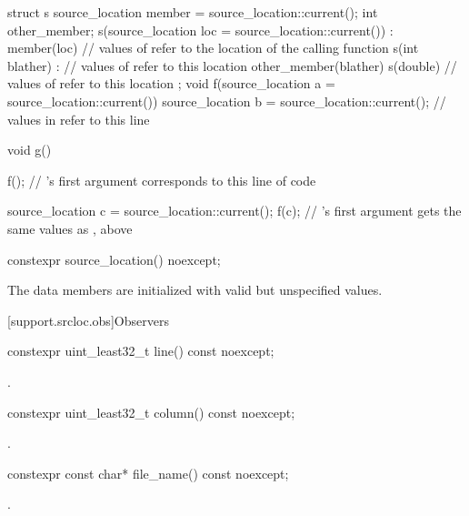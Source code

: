 \pnum
\begin{example}
\begin{codeblock}
struct s {
  source_location member = source_location::current();
  int other_member;
  s(source_location loc = source_location::current())
    : member(loc)               // values of  refer to the location of the calling function
  {}
  s(int blather) :              // values of  refer to this location
    other_member(blather)
  {}
  s(double)                     // values of  refer to this location
  {}
};
void f(source_location a = source_location::current()) {
  source_location b = source_location::current();       // values in  refer to this line
}

void g() {
  f();                          // 's first argument corresponds to this line of code

  source_location c = source_location::current();
  f(c);                         // 's first argument gets the same values as , above
}
\end{codeblock}
\end{example}

\begin{itemdecl}
constexpr source_location() noexcept;
\end{itemdecl}
\begin{itemdescr}

\pnum
{}
The data members are initialized with valid but unspecified values.
\end{itemdescr}

[support.srcloc.obs]{Observers}

\begin{itemdecl}
constexpr uint_least32_t line() const noexcept;
\end{itemdecl}
\begin{itemdescr}
\pnum
\returns
{}.
\end{itemdescr}

\begin{itemdecl}
constexpr uint_least32_t column() const noexcept;
\end{itemdecl}
\begin{itemdescr}
\pnum
\returns
{}.
\end{itemdescr}

\begin{itemdecl}
constexpr const char* file_name() const noexcept;
\end{itemdecl}
\begin{itemdescr}
\pnum
\returns
{}.
\end{itemdescr}

